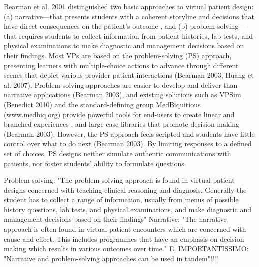  \cite{hirumi2016advancing} \par
Bearman et al. 2001  \cite{bearman2001random} distinguished two basic approaches to virtual patient design: (a) narrative—that presents students with a coherent storyline and decisions that have direct
consequences on the patient’s outcome , and (b) problem-solving—that requires students to collect information from patient histories, lab tests, and physical examinations to make diagnostic and management decisions based on their findings.
Most VPs are based on the problem-solving (PS) approach, presenting learners with multiple-choice actions to advance through different scenes that depict various provider-patient interactions (Bearman 2003, Huang et al. 2007). Problem-solving approaches are easier to develop and deliver than narrative applications (Bearman 2003), and existing solutions such as VPSim (Benedict 2010)  and the standard-defining group MedBiquitious (www.medbiq.org) provide powerful tools for end-users to create linear and branched experiences , and large case libraries that promote decision-making (Bearman 2003).
However, the PS approach feels scripted and students have little control over what to do next (Bearman 2003). By limiting responses to a defined set of choices, PS designs neither simulate authentic communications with patients, nor foster students’ ability to formulate questions.
\par
{}
Problem solving: "The problem-solving approach is found in virtual patient designs concerned with teaching clinical reasoning and diagnosis. Generally the student has to collect a range of information, usually from menus of possible history questions, lab tests, and physical examinations, and make diagnostic and management decisions based on their findings"
Narrative: "The narrative approach is often found in virtual patient encounters which are concerned with cause and effect. This includes programmes that have an emphasis on decision making which results in various outcomes over time."
E, IMPORTANTISSIMO: "Narrative and problem-solving approaches can be used in tandem"!!!!
